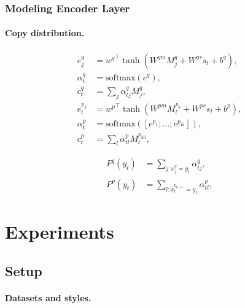 \documentclass[11pt,a4paper]{article}
\theoremstyle{mydef}
\theoremstyle{myprob}
\begin{document}
\subsubsection{Modeling Encoder Layer}

\paragraph{Copy distribution.}

\begin{align}
e^q_j &= {w^q}^\top \tanh(W^{qm} M_j^q + W^{qs} s_t +b^q), \\
\alpha^q_t &= \mathrm{softmax}(e^q), \\ 
c^q_t &= \textstyle \sum_j \alpha^q_{tj} M_j^q, \\
e^{p_k}_l &= {w^p}^\top \tanh(W^{pm} M_l^{p_k} + W^{ps} s_t +b^p), \\
\alpha^p_t &= \mathrm{softmax}([e^{p_1}; \ldots; e^{p_K}]), \\
c^p_t &=  \textstyle \sum_{l} \alpha^p_{tl} M^{p_\mathrm{all}}_{l}, 
\end{align}

\begin{align}
P^q(y_t) &=  \textstyle \sum_{j: x^q_j = y_t} \alpha^q_{tj}, \\
P^p(y_t) &= \textstyle \sum_{l: x^{p_{k(l)}}_{l} = y_t} \alpha^p_{tl},
\end{align}

\section{Experiments}

\subsection{Setup}

\paragraph{Datasets and styles.}
\end{document}
